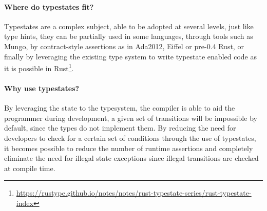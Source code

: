 \paragraph{Where do typestates fit?}
Typestates are a complex subject, able to be adopted at several levels,
just like type hints, they can be partially used in some languages,
through tools such as Mungo\autocite{Voinea2020},
by contract-style assertions as in Ada2012, Eiffel or pre-0.4 Rust,
or finally by leveraging the existing type system to write typestate enabled code as it is possible in
Rust\footnote{\url{https://rustype.github.io/notes/notes/rust-typestate-series/rust-typestate-index}}.

\paragraph{Why use typestates?}
By leveraging the state to the typesystem, the compiler is able to aid the programmer during development,
a given set of transitions will be impossible by default, since the types do not implement them. %
By reducing the need for developers to check for a certain set of conditions through the use of typestates,
it becomes possible to reduce the number of runtime assertions and
completely eliminate the need for illegal state exceptions since illegal transitions are checked at compile time.







